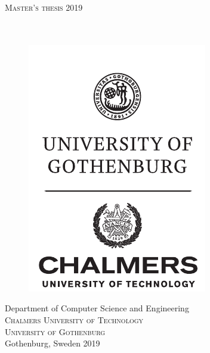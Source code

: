 \newpage
\thispagestyle{empty}
\begin{center}
	\textsc{\large Master's thesis 2019}\\[4cm]
	\textbf{\Large \titleA} \\[1cm]
	{\large \titleB}\\[1cm]
	{\large \me}
	
	\vfill	
	\begin{figure}[H]
	\centering
	\includegraphics[width=0.25\pdfpagewidth]{figure/auxiliary/ChGULogoHog.pdf}
	\end{figure}	\vspace{5mm}	
	
	Department of Computer Science and Engineering\\
	\textsc{Chalmers University of Technology} \\
	\textsc{University of Gothenburg} \\
	Gothenburg, Sweden 2019 \\
\end{center}


\newpage
\thispagestyle{plain}
\vspace*{4.5cm}
\titleA\\
\titleB\\
\me \vspace{1cm}

